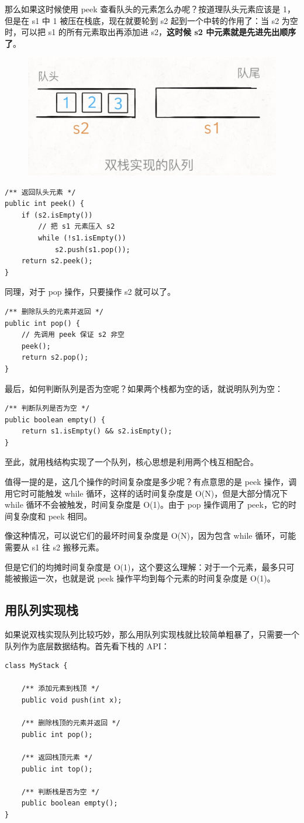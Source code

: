 \documentclass[12pt]{article}
\begin{document}
那么如果这时候使用 peek 查看队头的元素怎么办呢？按道理队头元素应该是 1，但是在 s1 中 1 被压在栈底，现在就要轮到 s2 起到一个中转的作用了：当 s2 为空时，可以把 s1 的所有元素取出再添加进 s2，\textbf{这时候 s2 中元素就是先进先出顺序了}。
\begin{figure}[H]
    \centering
    \includegraphics[width=.5\textwidth]{fig/Queue_Stack_Implementation_3.png}
\end{figure}

\begin{lstlisting}
/** 返回队头元素 */
public int peek() {
    if (s2.isEmpty())
        // 把 s1 元素压入 s2
        while (!s1.isEmpty())
            s2.push(s1.pop());
    return s2.peek();
}
\end{lstlisting}

同理，对于 pop 操作，只要操作 s2 就可以了。
\begin{lstlisting}
/** 删除队头的元素并返回 */
public int pop() {
    // 先调用 peek 保证 s2 非空
    peek();
    return s2.pop();
}
\end{lstlisting}

最后，如何判断队列是否为空呢？如果两个栈都为空的话，就说明队列为空：
\begin{lstlisting}
/** 判断队列是否为空 */
public boolean empty() {
    return s1.isEmpty() && s2.isEmpty();
}
\end{lstlisting}

至此，就用栈结构实现了一个队列，核心思想是利用两个栈互相配合。

值得一提的是，这几个操作的时间复杂度是多少呢？有点意思的是 peek 操作，调用它时可能触发 while 循环，这样的话时间复杂度是 O(N)，但是大部分情况下 while 循环不会被触发，时间复杂度是 O(1)。由于 pop 操作调用了 peek，它的时间复杂度和 peek 相同。

像这种情况，可以说它们的最坏时间复杂度是 O(N)，因为包含 while 循环，可能需要从 s1 往 s2 搬移元素。

但是它们的均摊时间复杂度是 O(1)，这个要这么理解：对于一个元素，最多只可能被搬运一次，也就是说 peek 操作平均到每个元素的时间复杂度是 O(1)。

\subsection{用队列实现栈}
如果说双栈实现队列比较巧妙，那么用队列实现栈就比较简单粗暴了，只需要一个队列作为底层数据结构。首先看下栈的 API：
\begin{lstlisting}
class MyStack {
    
    /** 添加元素到栈顶 */
    public void push(int x);
    
    /** 删除栈顶的元素并返回 */
    public int pop();
    
    /** 返回栈顶元素 */
    public int top();
    
    /** 判断栈是否为空 */
    public boolean empty();
}
\end{lstlisting}
\end{document}
